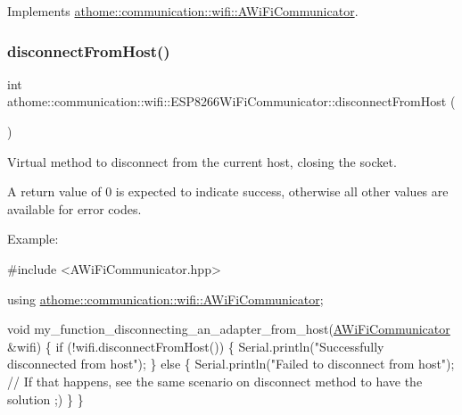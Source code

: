 Implements \mbox{\hyperlink{classathome_1_1communication_1_1wifi_1_1_a_wi_fi_communicator_a6131240ac0daa0f9fb4d46871feea4c2}{athome\+::communication\+::wifi\+::\+A\+Wi\+Fi\+Communicator}}.

\mbox{\label{classathome_1_1communication_1_1wifi_1_1_e_s_p8266_wi_fi_communicator_a0f8adbe1b1d219148c4f340980056356}} 
\subsubsection{\texorpdfstring{disconnect\+From\+Host()}{disconnectFromHost()}}
{\footnotesize\ttfamily int athome\+::communication\+::wifi\+::\+E\+S\+P8266\+Wi\+Fi\+Communicator\+::disconnect\+From\+Host (\begin{DoxyParamCaption}{ }\end{DoxyParamCaption})\hspace{0.3cm}{\ttfamily [virtual]}}

Virtual method to disconnect from the current host, closing the socket.

A return value of 0 is expected to indicate success, otherwise all other values are available for error codes.

Example\+:


\begin{DoxyCode}
\textcolor{preprocessor}{#include <AWiFiCommunicator.hpp>}

\textcolor{keyword}{using} \mbox{\hyperlink{classathome_1_1communication_1_1wifi_1_1_a_wi_fi_communicator}{athome::communication::wifi::AWiFiCommunicator}};

\textcolor{keywordtype}{void} my\_function\_disconnecting\_an\_adapter\_from\_host(\mbox{\hyperlink{classathome_1_1communication_1_1wifi_1_1_a_wi_fi_communicator_a0098148fe8d0eeee99b7f8f72a72a900}{AWiFiCommunicator}} &wifi) \{
  \textcolor{keywordflow}{if} (!wifi.disconnectFromHost()) \{
    Serial.println(\textcolor{stringliteral}{"Successfully disconnected from host"});
  \} \textcolor{keywordflow}{else} \{
    Serial.println(\textcolor{stringliteral}{"Failed to disconnect from host"}); \textcolor{comment}{// If that happens, see the same scenario on
       disconnect method to have the solution ;)}
  \}
\}
\end{DoxyCode}
 

